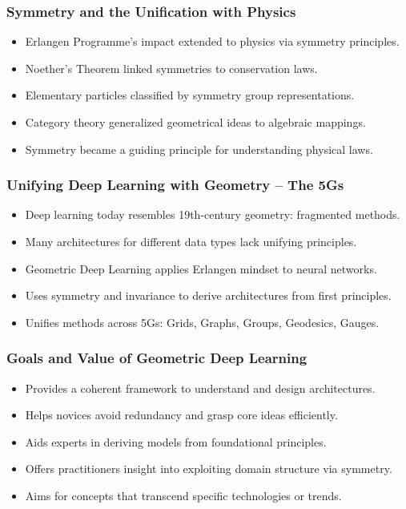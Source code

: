 \begin{frame}[fragile]\frametitle{Symmetry and the Unification with Physics}
  \begin{itemize}
    \item Erlangen Programme’s impact extended to physics via symmetry principles.
    \item Noether’s Theorem linked symmetries to conservation laws.
    \item Elementary particles classified by symmetry group representations.
    \item Category theory generalized geometrical ideas to algebraic mappings.
    \item Symmetry became a guiding principle for understanding physical laws.
  \end{itemize}
\end{frame}

\begin{frame}[fragile]\frametitle{Unifying Deep Learning with Geometry – The 5Gs}
  \begin{itemize}
    \item Deep learning today resembles 19th-century geometry: fragmented methods.
    \item Many architectures for different data types lack unifying principles.
    \item Geometric Deep Learning applies Erlangen mindset to neural networks.
    \item Uses symmetry and invariance to derive architectures from first principles.
    \item Unifies methods across 5Gs: Grids, Graphs, Groups, Geodesics, Gauges.
  \end{itemize}
\end{frame}

\begin{frame}[fragile]\frametitle{Goals and Value of Geometric Deep Learning}
  \begin{itemize}
    \item Provides a coherent framework to understand and design architectures.
    \item Helps novices avoid redundancy and grasp core ideas efficiently.
    \item Aids experts in deriving models from foundational principles.
    \item Offers practitioners insight into exploiting domain structure via symmetry.
    \item Aims for concepts that transcend specific technologies or trends.
  \end{itemize}
\end{frame}

